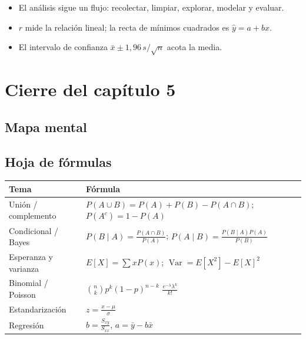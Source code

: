 
\begin{tmresumen}
\begin{itemize}
\item El an\'alisis sigue un flujo: recolectar, limpiar, explorar, modelar y evaluar.
\item $r$ mide la relaci\'on lineal; la recta de m\'inimos cuadrados es $\hat y=a+bx$.
\item El intervalo de confianza $\bar x\pm1{,}96\,s/\sqrt n$ acota la media.
\end{itemize}
\end{tmresumen}

\clearpage
\section*{Cierre del cap\'itulo 5}
\subsection{Mapa mental}

\subsection{Hoja de f\'ormulas}
\begin{center}
\begin{tabular}{|p{4.2cm}|p{8.4cm}|}
\hline
\rowcolor{tmAzulClaro}\textbf{Tema} & \textbf{F\'ormula}\\ \hline
Uni\'on / complemento & $P(A\cup B)=P(A)+P(B)-P(A\cap B)$; $P(A^c)=1-P(A)$\\ \hline
Condicional / Bayes & $P(B\mid A)=\frac{P(A\cap B)}{P(A)}$; $P(A\mid B)=\frac{P(B\mid A)P(A)}{P(B)}$\\ \hline
Esperanza y varianza & $E[X]=\sum xP(x)$; $\operatorname{Var}=E[X^2]-E[X]^2$\\ \hline
Binomial / Poisson & $\binom nkp^k(1-p)^{n-k}$ \quad $\frac{e^{-\lambda}\lambda^k}{k!}$\\ \hline
Estandarizaci\'on & $z=\frac{x-\mu}\sigma$\\ \hline
Regresi\'on & $b=\frac{S_{xy}}{S_{xx}}$, $a=\bar y-b\bar x$\\ \hline
\end{tabular}
\end{center}

